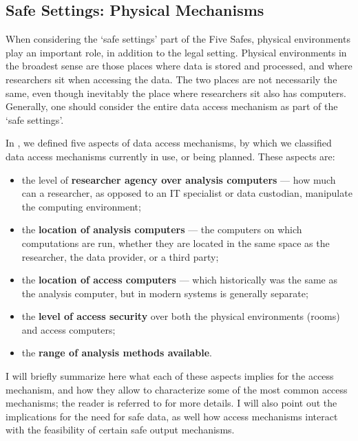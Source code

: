 
\subsection{Safe Settings: Physical Mechanisms}

When considering the `safe settings' part of the Five Safes, physical environments play an important role, in addition to the legal setting. Physical environments in the broadest sense are those places where data is stored and processed, and where researchers sit when accessing the data. The two places are not necessarily the same, even though inevitably the place where researchers sit also has computers. Generally, one should consider the entire data access mechanism as part of the `safe settings'.

In \cite{shen_physically_2021}, we defined five aspects of data access mechanisms, by which we classified data access mechanisms currently in use, or being planned. These aspects are:
\begin{itemize}
    \item the level of \textbf{researcher agency over analysis computers} --- how much can a researcher, as opposed to an IT specialist or data custodian, manipulate the computing environment;
    \item the \textbf{location of analysis computers} --- the computers on which computations are run, whether they are located in the same space as the researcher, the data provider, or a third party;
    \item the \textbf{location of access computers} --- which historically was the same as the analysis computer, but in modern systems is generally separate;
    \item the \textbf{level of access security} over both the physical environments (rooms) and access computers;
    \item the \textbf{range of analysis methods available}.
\end{itemize}

I will briefly summarize here what each of these aspects implies for the access mechanism, and how they allow to characterize some of the most common access mechanisms; the reader is referred to \cite{shen_physically_2021} for more details. I will also point out the implications for the need for safe data, as well how access mechanisms interact with the feasibility of certain safe output mechanisms.


